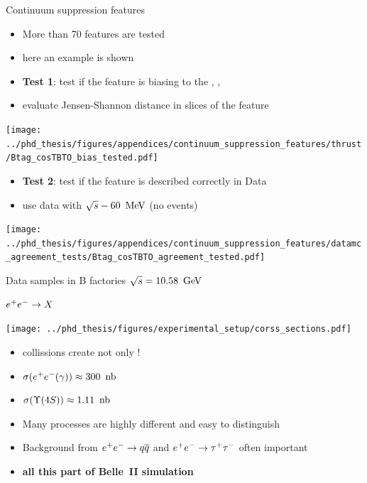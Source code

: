 \documentclass[xcolor=dvipsnames]{beamer}
\begin{document}
\begin{frame}{Continuum suppression features}

   \scriptsize\centering

   \begin{itemize}
      \item More than 70 features are tested
      \item[\ra] here an example is shown
   \end{itemize}

   \begin{itemize}
      \item \textbf{Test 1}: test if the feature is biasing to the \EB, \Estar, \Mbc  
      \item[\ra] evaluate Jensen-Shannon distance in slices of the feature
   \end{itemize}

   \texttt{[image: ../phd\_thesis/figures/appendices/continuum\_suppression\_features/thrust/Btag\_cosTBTO\_bias\_tested.pdf]}


   \begin{itemize}
      \item \textbf{Test 2}: test if the feature is described correctly in Data
      \item[\ra] use data with $\sqrt{s}-60~\mathrm{\,Me\kern -0.1em V}$ (no \FourS events)
   \end{itemize}



   \texttt{[image: ../phd\_thesis/figures/appendices/continuum\_suppression\_features/datamc\_agreement\_tests/Btag\_cosTBTO\_agreement\_tested.pdf]}

\end{frame}

   \begin{frame}{Data samples in B factories}
      \scriptsize\centering
      \textbf{$\sqrt{s} = 10.58~\mathrm{\,Ge\kern -0.1em V}$}
      
      $e^+e^-\rightarrow X$

      \texttt{[image: ../phd\_thesis/figures/experimental\_setup/corss\_sections.pdf]}
      \begin{itemize}
         \item \epem collissions create not only \FourS!
         \item[] $\sigma({e^+e^-(\gamma)}) \approx 300~{\rm \,nb}$
         \item[] $\sigma({\FourS}) \approx 1.11~\nb$
         \item Many processes are highly different and easy to distinguish
         \item Background from $e^+e^-\rightarrow q\overline q$ and $e^+e^-\rightarrow\tau^+\tau^-$ often important
         \item[\ra] \textbf{all this part of Belle~II simulation}
      \end{itemize}
   \end{frame}
\end{document}
